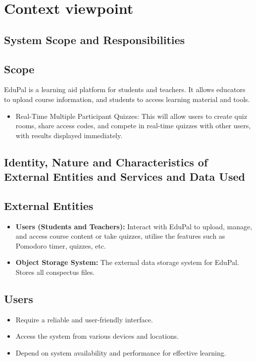 \section{Context viewpoint}


\subsection{System Scope and Responsibilities}

\subsection*{Scope}
EduPal is a learning aid platform for students and teachers. It allows educators to upload course information, and students to access learning material and tools.

\begin{itemize}
    \item Real-Time Multiple Participant Quizzes: This will allow users to create quiz rooms, share access codes, and compete in real-time quizzes with other users, with results displayed immediately.
\end{itemize}


\subsection{Identity, Nature and Characteristics of External Entities and Services and Data Used}

\subsection*{External Entities}
\begin{itemize}
    \item \textbf{Users (Students and Teachers):} Interact with EduPal to upload, manage, and access course content or take quizzes, utilise the features such as Pomodoro timer, quizzes, etc.
    \item \textbf{Object Storage System:} The external data storage system for EduPal. Stores all conspectus files.
\end{itemize}

\subsection*{Users}
\begin{itemize}
    \item Require a reliable and user-friendly interface.
    \item Access the system from various devices and locations.
    \item Depend on system availability and performance for effective learning.
\end{itemize}

